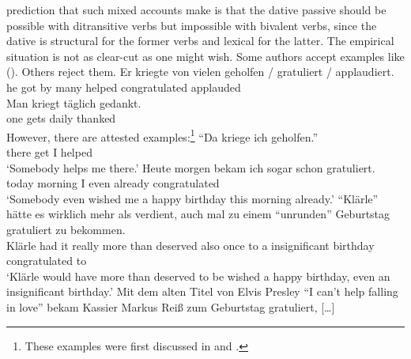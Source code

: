 prediction that such mixed accounts make is that the dative passive should be possible with
ditransitive verbs but impossible with bivalent verbs, since the dative is structural for the former
verbs and lexical for the latter. The empirical situation is not as clear-cut as one might
wish. Some authors accept examples like (). Others reject them.
\eal
\label{ex-helfen-with-dative-passive}
\ex 
\gll Er kriegte von vielen geholfen / gratuliert / applaudiert.\\
     he got by many helped {} congratulated {} applauded\\
\ex 
\gll Man kriegt täglich gedankt.\\
     one gets   daily thanked\\
\zl
However, there are attested examples:\footnote{
  These examples were first discussed in  and .
}
\eal
\label{ex-helfen-with-dative-passive-corpus}
\ex "`Da kriege ich geholfen."'\footnotemark\\
     \quotespace{}there get  I  helped\\
\glt `Somebody helps me there.'
\ex
\gll Heute morgen bekam ich sogar schon gratuliert.\footnotemark\\
     today morning \AUX{}  I even already congratulated\\
\glt `Somebody even wished me a happy birthday this morning already.'
\ex
\gll "`Klärle"' hätte es wirklich mehr als verdient, auch mal zu einem "`unrunden"' Geburtstag gratuliert zu bekommen.\footnotemark\\
     \hphantom{"`}Klärle had it really more than deserved also once to a \hphantom{"`}insignificant birthday congratulated to \AUX\\
\glt `Klärle would have more than deserved to be wished a happy birthday, even an insignificant birthday.'
\ex 
\gll Mit dem alten Titel von Elvis Presley "`I can't help falling in love"' bekam Kassier Markus Reiß zum Geburtstag gratuliert, [\ldots]\footnotemark\\
